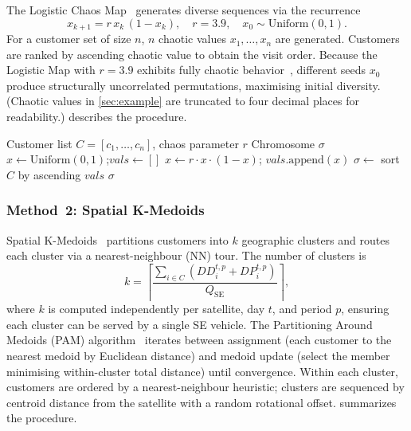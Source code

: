 \documentclass[11pt, a4paper]{article}
\newcommand{\QSE}{Q_{\mathrm{SE}}}
\numberwithin{equation}{section}
\begin{document}
The Logistic Chaos Map~\cite{may1976,ren2024} generates diverse sequences
via the recurrence
\begin{equation}
  x_{k+1} = r\,x_k\,(1-x_k),\quad r=3.9,\quad x_0\sim\mathrm{Uniform}(0,1).
  \label{eq:chaos}
\end{equation}
For a customer set of size $n$, $n$ chaotic values $x_1,\ldots,x_n$ are
generated.  Customers are ranked by ascending chaotic value to obtain the
visit order.  Because the Logistic Map with $r=3.9$ exhibits fully chaotic
behavior~\cite{may1976}, different seeds $x_0$ produce structurally
uncorrelated permutations, maximising initial diversity.
(Chaotic values in \cref{sec:example} are truncated to four decimal places
for readability.)
 describes the procedure.

\begin{algorithm}[ht]
\caption{Chaos Map initialization for one population slot}
\label{alg:chaos}
\begin{algorithmic}[1]
\Require Customer list $C=[c_1,\ldots,c_n]$, chaos parameter $r$
\Ensure Chromosome $\sigma$
\State $x \leftarrow \mathrm{Uniform}(0,1)$;\quad $\mathit{vals}\leftarrow[]$
  \State $x \leftarrow r\cdot x\cdot(1-x)$;\quad
         $\mathit{vals}.\mathrm{append}(x)$
\EndFor
\State $\sigma \leftarrow$ sort $C$ by ascending $\mathit{vals}$
\State \Return $\sigma$
\end{algorithmic}
\end{algorithm}

\subsubsection{Method~2: Spatial K-Medoids}
\label{sec:init:kmed}

Spatial K-Medoids~\cite{kaufman1990,park2009,wang2022collaborative} partitions
customers into $k$ geographic clusters and routes each cluster via a
nearest-neighbour (NN) tour.  The number of clusters is
\begin{equation}
  k = \left\lceil\frac{\sum_{i\in C}(DD_i^{t,p}+DP_i^{t,p})}{\QSE}\right\rceil,
  \label{eq:kval}
\end{equation}
where $k$ is computed independently per satellite, day $t$, and period $p$,
ensuring each cluster can be served by a single SE vehicle.
The Partitioning Around Medoids (PAM) algorithm~\cite{kaufman1990} iterates
between assignment (each customer to the nearest medoid by Euclidean distance)
and medoid update (select the member minimising within-cluster total distance)
until convergence.  Within each cluster, customers are ordered by a
nearest-neighbour heuristic; clusters are sequenced by centroid distance
from the satellite with a random rotational offset.  
summarizes the procedure.
\end{document}
